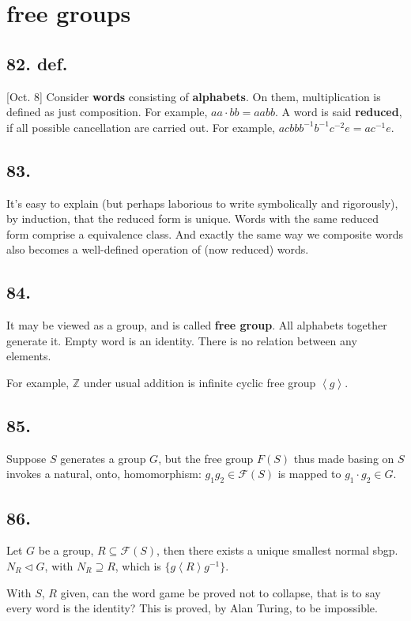 \documentclass[12pt]{article}
\newcommand\M\cdot%
\newcommand{\Ab}[1]{ \left\langle #1 \right\rangle } %
\newcommand{\BF}[1]{ \mathbb{#1} }%
\newcommand{\CF}[1]{ \mathcal{#1} }%
\newcommand{\Ss}[1]{\textsf{\textbf{#1}}}%
\begin{document}
\section{free groups}
\subsection*{82. def.} [Oct. 8] Consider \Ss{words} consisting of \Ss{alphabets}. 
On them, multiplication is defined as just composition. 
For example, \(aa \M bb =aabb\). 
A word is said \Ss{reduced}, if all possible cancellation are carried out. 
For example, \(acbb b^{-1}b^{-1} c^{-2}e =ac^{-1}e\).

\subsection*{83.} It's easy to explain (but perhaps laborious to write symbolically and rigorously), by induction, that the reduced form is unique. 
Words with the same reduced form comprise a equivalence class. 
And exactly the same way we composite words also becomes a well-defined operation of (now reduced) words. 

\subsection*{84.} It may be viewed as a group, and is called \Ss{free group}. 
All alphabets together generate it. 
Empty word is an identity. 
There is no relation between any elements. \par
For example, \(\BF Z\) under usual addition is infinite cyclic free group \(\Ab{g}\). 

\subsection*{85.} Suppose \(S\) generates a group \(G\), but the free group \(F(S)\) thus made basing on \(S\) invokes a natural, onto, homomorphism: \(g_1 g_2 \in \CF F(S)\) is mapped to \(g_1 \M g_2 \in G\). 

\subsection*{86.} Let \(G\) be a group, \(R \subseteq \CF F(S)\), then there exists a unique smallest normal sbgp.\ \(N_R \lhd G\), with \(N_R \supseteq R\), which is \(\{g \Ab{R} g^{-1}\}\). \par
With \(S\), \(R\) given, can the word game be proved not to collapse, that is to say every word is the identity? 
This is proved, by Alan Turing, to be impossible. 
\end{document}

